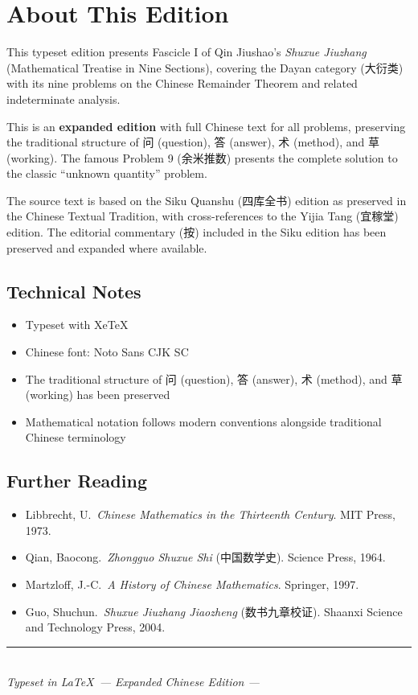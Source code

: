 \documentclass[11pt,a4paper]{article}
\newcommand{\zhtext}[1]{{\chinese #1}}
\begin{document}
\newpage
\section*{About This Edition}

This typeset edition presents Fascicle I of Qin Jiushao's \textit{Shuxue Jiuzhang} (Mathematical Treatise in Nine Sections), covering the Dayan category (\zhtext{大衍类}) with its nine problems on the Chinese Remainder Theorem and related indeterminate analysis.

This is an \textbf{expanded edition} with full Chinese text for all problems, preserving the traditional structure of \zhtext{问} (question), \zhtext{答} (answer), \zhtext{术} (method), and \zhtext{草} (working). The famous Problem 9 (\zhtext{余米推数}) presents the complete solution to the classic ``unknown quantity'' problem.

The source text is based on the Siku Quanshu (\zhtext{四库全书}) edition as preserved in the Chinese Textual Tradition, with cross-references to the Yijia Tang (\zhtext{宜稼堂}) edition. The editorial commentary (\zhtext{按}) included in the Siku edition has been preserved and expanded where available.

\subsection*{Technical Notes}
\begin{itemize}
  \item Typeset with XeTeX
  \item Chinese font: Noto Sans CJK SC
  \item The traditional structure of \zhtext{问} (question), \zhtext{答} (answer), \zhtext{术} (method), and \zhtext{草} (working) has been preserved
  \item Mathematical notation follows modern conventions alongside traditional Chinese terminology
\end{itemize}

\subsection*{Further Reading}
\begin{itemize}
  \item Libbrecht, U.\ \textit{Chinese Mathematics in the Thirteenth Century}. MIT Press, 1973.
  \item Qian, Baocong.\ \textit{Zhongguo Shuxue Shi} (\zhtext{中国数学史}). Science Press, 1964.
  \item Martzloff, J.-C.\ \textit{A History of Chinese Mathematics}. Springer, 1997.
  \item Guo, Shuchun.\ \textit{Shuxue Jiuzhang Jiaozheng} (\zhtext{数书九章校证}). Shaanxi Science and Technology Press, 2004.
\end{itemize}

\vfill
\begin{center}
\textcolor{rulecolor}{\rule{0.5\textwidth}{0.4pt}}\\[0.5em]
\textit{Typeset in \LaTeX\ --- Expanded Chinese Edition --- \the\year}
\end{center}
\end{document}
